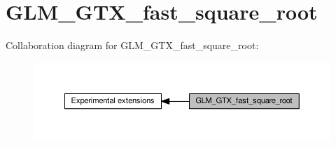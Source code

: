 \hypertarget{group__gtx__fast__square__root}{}\section{G\+L\+M\+\_\+\+G\+T\+X\+\_\+fast\+\_\+square\+\_\+root}
\label{group__gtx__fast__square__root}
Collaboration diagram for G\+L\+M\+\_\+\+G\+T\+X\+\_\+fast\+\_\+square\+\_\+root\+:
\nopagebreak
\begin{figure}[H]
\begin{center}
\leavevmode
\includegraphics[width=350pt]{da/d53/group__gtx__fast__square__root}
\end{center}
\end{figure}
